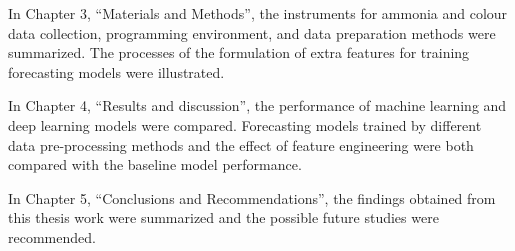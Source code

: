 In Chapter 3, “Materials and Methods”, the instruments for ammonia and colour data collection, programming environment, and data preparation methods were summarized. The processes of the formulation of extra features for training forecasting models were illustrated.

In Chapter 4, “Results and discussion”, the performance of machine learning and deep learning models were compared. Forecasting models trained by different data pre-processing methods and the effect of feature engineering were both compared with the baseline model performance. 

In Chapter 5, “Conclusions and Recommendations”, the findings obtained from this thesis work were summarized and the possible future studies were recommended.